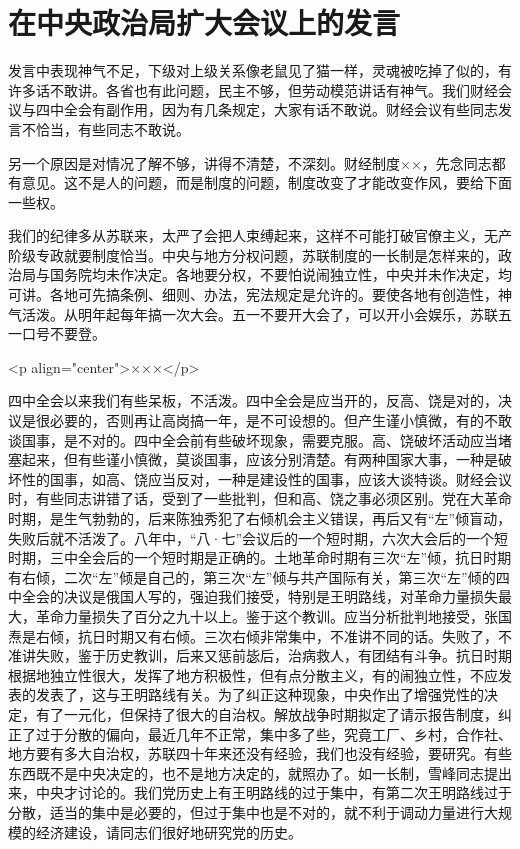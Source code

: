 \section[在中央政治局扩大会议上的发言（一九五六年四月二十五日）]{在中央政治局扩大会议上的发言}


发言中表现神气不足，下级对上级关系像老鼠见了猫一样，灵魂被吃掉了似的，有许多话不敢讲。各省也有此问题，民主不够，但劳动模范讲话有神气。我们财经会议与四中全会有副作用，因为有几条规定，大家有话不敢说。财经会议有些同志发言不恰当，有些同志不敢说。

另一个原因是对情况了解不够，讲得不清楚，不深刻。财经制度××，先念同志都有意见。这不是人的问题，而是制度的问题，制度改变了才能改变作风，要给下面一些权。

我们的纪律多从苏联来，太严了会把人束缚起来，这样不可能打破官僚主义，无产阶级专政就要制度恰当。中央与地方分权问题，苏联制度的一长制是怎样来的，政治局与国务院均未作决定。各地要分权，不要怕说闹独立性，中央并未作决定，均可讲。各地可先搞条例、细则、办法，宪法规定是允许的。要使各地有创造性，神气活泼。从明年起每年搞一次大会。五一不要开大会了，可以开小会娱乐，苏联五一口号不要登。

<p align="center">×××</p>

四中全会以来我们有些呆板，不活泼。四中全会是应当开的，反高、饶是对的，决议是很必要的，否则再让高岗搞一年，是不可设想的。但产生谨小慎微，有的不敢谈国事，是不对的。四中全会前有些破坏现象，需要克服。高、饶破坏活动应当堵塞起来，但有些谨小慎微，莫谈国事，应该分别清楚。有两种国家大事，一种是破坏性的国事，如高、饶应当反对，一种是建设性的国事，应该大谈特谈。财经会议时，有些同志讲错了话，受到了一些批判，但和高、饶之事必须区别。党在大革命时期，是生气勃勃的，后来陈独秀犯了右倾机会主义错误，再后又有“左”倾盲动，失败后就不活泼了。八年中，“八·七”会议后的一个短时期，六次大会后的一个短时期，三中全会后的一个短时期是正确的。土地革命时期有三次“左”倾，抗日时期有右倾，二次“左”倾是自己的，第三次“左”倾与共产国际有关，第三次“左”倾的四中全会的决议是俄国人写的，强迫我们接受，特别是王明路线，对革命力量损失最大，革命力量损失了百分之九十以上。鉴于这个教训。应当分析批判地接受，张国焘是右倾，抗日时期又有右倾。三次右倾非常集中，不准讲不同的话。失败了，不准讲失败，鉴于历史教训，后来又惩前毖后，治病救人，有团结有斗争。抗日时期根据地独立性很大，发挥了地方积极性，但有点分散主义，有的闹独立性，不应发表的发表了，这与王明路线有关。为了纠正这种现象，中央作出了增强党性的决定，有了一元化，但保持了很大的自治权。解放战争时期拟定了请示报告制度，纠正了过于分散的偏向，最近几年不正常，集中多了些，究竟工厂、乡村，合作社、地方要有多大自治权，苏联四十年来还没有经验，我们也没有经验，要研究。有些东西既不是中央决定的，也不是地方决定的，就照办了。如一长制，雪峰同志提出来，中央才讨论的。我们党历史上有王明路线的过于集中，有第二次王明路线过于分散，适当的集中是必要的，但过于集中也是不对的，就不利于调动力量进行大规模的经济建设，请同志们很好地研究党的历史。

